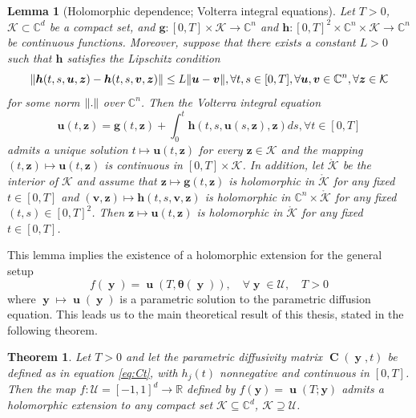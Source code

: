 \documentclass[12pt, oneside]{report}   	%
\newtheorem{theorem}{Theorem}
\newcommand{\R}{\mathbb{R}}
\newcommand{\C}{\mathbb{C}}
\newtheorem{lem}{Lemma}
\DeclarePairedDelimiter{\norm}{\lVert}{\rVert}        %
\DeclareMathOperator{\CC}{\boldsymbol{C}}
\DeclareMathOperator{\uu}{\boldsymbol{u}}
\DeclareMathOperator{\y}{\boldsymbol{y}}
\begin{document}
\begin{lem}[Holomorphic dependence; Volterra integral equations]
\label{lem:holo}
Let $T>0$, $\mathcal{K}\subset\C^d$ be a compact set, and $\boldsymbol{g}:[0,T]\times\mathcal{K}\to\C^n$ and $\boldsymbol{h}:[0,T]^2\times\C^n\times\mathcal{K}\to\C^n$ be continuous functions. Moreover, suppose that there exists a constant $L>0$ such that $\boldsymbol{h}$ satisfies the Lipschitz condition
$$
\norm{\boldsymbol{h}(t,s,\boldsymbol{u},\boldsymbol{z}) - \boldsymbol{h}(t,s,\boldsymbol{v},\boldsymbol{z})} \leq L\norm{\boldsymbol{u}-\boldsymbol{v}}, \forall t,s\in[0,T], \forall \boldsymbol{u},\boldsymbol{v}\in\C^n, \forall \boldsymbol{z}\in\mathcal{K}
$$
for some norm $\norm{.}$ over $\C^n$. Then the Volterra integral equation
$$
\boldsymbol{u}(t,\boldsymbol{z}) = \boldsymbol{g}(t,\boldsymbol{z}) + \int_{0}^{t} \boldsymbol{h}(t,s,\boldsymbol{u}(s,\boldsymbol{z}),\boldsymbol{z}) ds, \forall t\in[0,T]
$$
admits a unique solution $t\mapsto\boldsymbol{u}(t,\boldsymbol{z})$ for every $\boldsymbol{z}\in\mathcal{K}$ and the mapping $(t,\boldsymbol{z})\mapsto\boldsymbol{u}(t,\boldsymbol{z})$ is continuous in $[0,T]\times\mathcal{K}$. In addition, let $\mathring{\mathcal{K}}$ be the interior of $\mathcal{K}$ and assume that $\boldsymbol{z}\mapsto\boldsymbol{g}(t,\boldsymbol{z})$ is holomorphic in $\mathring{\mathcal{K}}$ for any fixed $t\in[0,T]$ and $(\boldsymbol{v},\boldsymbol{z})\mapsto\boldsymbol{h}(t,s,\boldsymbol{v},\boldsymbol{z})$ is holomorphic in $\C^n\times\mathring{\mathcal{K}}$ for any fixed $(t,s)\in[0,T]^2$. Then $\boldsymbol{z}\mapsto\boldsymbol{u}(t,\boldsymbol{z})$ is holomorphic in $\mathring{\mathcal{K}}$ for any fixed $t\in[0,T]$.  
\end{lem}

\noindent This lemma implies the existence of a holomorphic extension for the general setup
$$
f(\y)=\uu(T,\boldsymbol{\theta}(\y)), \quad\forall\y\in\mathcal{U}, \quad T>0
$$
where $\y\mapsto\uu(\y)$ is a parametric solution to the parametric diffusion equation. This leads us to the main theoretical result of this thesis, stated in the following theorem.

\begin{tcolorbox}[colframe=white]
\begin{theorem}
\label{thm:mainthm}
Let $T>0$ and let the parametric diffusivity matrix $\CC(\y,t)$ be defined as in equation \eqref{eq:Ct}, with $h_j(t)$ nonnegative and continuous in $[0,T]$. Then the map $f:\mathcal{U}=[-1,1]^d\to\R$ defined by $f(\boldsymbol{y})=\uu(T;\boldsymbol{y})$ admits a holomorphic extension to any compact set $\mathcal{K}\subseteq\C^d$, $\mathcal{K}\supseteq \mathcal{U}$.
\end{theorem}
\end{tcolorbox}
\end{document}
